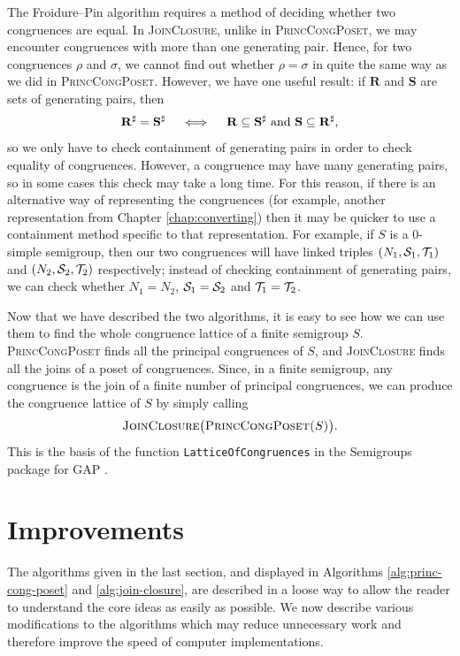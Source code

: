 The Froidure--Pin algorithm requires a method of deciding whether two
congruences are equal.  In \textsc{JoinClosure}, unlike in
\textsc{PrincCongPoset}, we may encounter congruences with more than one
generating pair.  Hence, for two congruences $\rho$ and $\sigma$, we cannot find
out whether $\rho = \sigma$ in quite the same way as we did in
\textsc{PrincCongPoset}.  However, we have one useful result: if $\mathbf{R}$
and $\mathbf{S}$ are sets of generating pairs, then
$$\mathbf{R}^\sharp = \mathbf{S}^\sharp \quad\iff\quad
\mathbf{R} \subseteq \mathbf{S}^\sharp \textnormal{~and~}
\mathbf{S} \subseteq \mathbf{R}^\sharp,$$
so we only have to check containment of generating pairs in order to check
equality of congruences.  However, a congruence may have many generating pairs,
so in some cases this check may take a long time.  For this reason, if there is
an alternative way of representing the congruences (for example, another
representation from Chapter \ref{chap:converting}) then it may be quicker to use
a containment method specific to that representation.  For example, if $S$ is a
0-simple semigroup, then our two congruences will have linked triples
$(N_1,\mathcal{S}_1,\mathcal{T}_1)$ and $(N_2,\mathcal{S}_2,\mathcal{T}_2)$ respectively; instead of checking
containment of generating pairs, we can check whether $N_1 = N_2$,
$\mathcal{S}_1 = \mathcal{S}_2$ and $\mathcal{T}_1 = \mathcal{T}_2$.

Now that we have described the two algorithms, it is easy to see how we can use
them to find the whole congruence lattice of a finite semigroup $S$.
\textsc{PrincCongPoset} finds all the principal congruences of $S$, and
\textsc{JoinClosure} finds all the joins of a poset of congruences.  Since, in a
finite semigroup, any congruence is the join of a finite number of principal
congruences, we can produce the congruence lattice of $S$ by simply calling
$$\textsc{JoinClosure\big(PrincCongPoset($S$)\big)}.$$  This is the basis of the
function \texttt{LatticeOfCongruences} in the Semigroups package for GAP
\cite{semigroups}.

\section{Improvements}
\label{sec:lattice-improvements}

The algorithms given in the last section, and displayed in Algorithms
\ref{alg:princ-cong-poset} and \ref{alg:join-closure}, are described in a loose
way to allow the reader to understand the core ideas as easily as possible.  We
now describe various modifications to the algorithms which may reduce
unnecessary work and therefore improve the speed of computer implementations.

